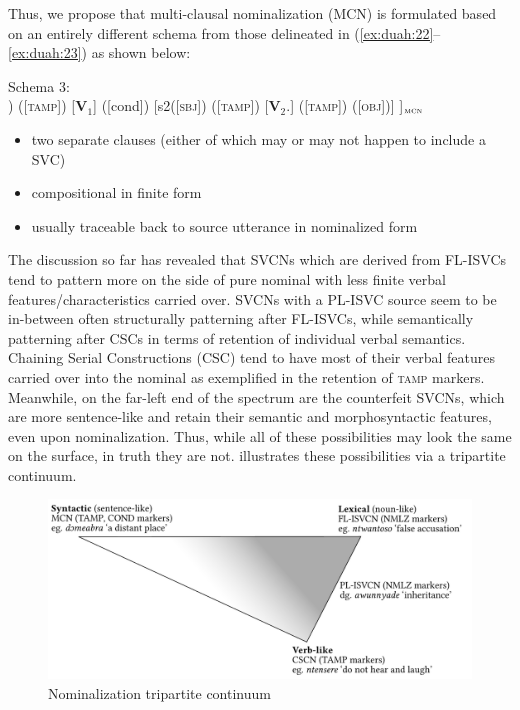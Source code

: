 \documentclass[output=paper
,newtxmath
,modfonts
,nonflat]{langsci/langscibook}
\begin{document}
Thus, we propose that multi-clausal nominalization (MCN) is formulated based on an entirely different schema from those delineated in (\ref{ex:duah:22}--\ref{ex:duah:23}) as shown below:

\ea
Schema 3:\\	[s1 ([\textsc{sbj}]) ([\textsc{tamp}]) [\textbf{V}$_1$] ([cond])	[s2([\textsc{sbj}]) ([\textsc{tamp}])
										[\textbf{V}$_2$.]	([\textsc{tamp}]) ([\textsc{obj}])] ]$_{\textsc{mcn}}$
\begin{itemize}
\item two separate clauses (either of which may or may not happen to include a SVC)
\item compositional in finite form
\item usually traceable back to source utterance in nominalized form
\end{itemize}
\z

The discussion so far has revealed that SVCNs which are derived from FL-ISVCs tend to pattern more on the side of pure nominal with less finite verbal features/characteristics carried over. SVCNs with a PL-ISVC source seem to be in-between often structurally patterning after FL-ISVCs, while semantically patterning after CSCs in terms of retention of individual verbal semantics. Chaining Serial Constructions (CSC) tend to have most of their verbal features carried over into the nominal as exemplified in the retention of \textsc{tamp} markers. Meanwhile, on the far-left end of the spectrum are the counterfeit SVCNs, which are more sentence-like and retain their semantic and morphosyntactic features, even upon nominalization. Thus, while all of these possibilities may look the same on the surface, in truth they are not.  illustrates these possibilities via a tripartite continuum.

\begin{figure}
\includegraphics[width=\textwidth]{fig-duah-2}
\caption{Nominalization tripartite continuum}
\label{fig:duah:4}
\end{figure}
\end{document}
